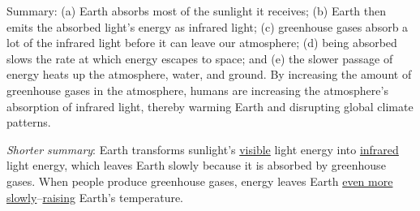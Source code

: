 Summary: (a) Earth absorbs most of the sunlight it receives; (b) Earth then
emits the absorbed light's energy as infrared light; (c) greenhouse gases absorb
a lot of the infrared light before it can leave our atmosphere; (d) being
absorbed slows the rate at which energy escapes to space; and (e) the slower
passage of energy heats up the atmosphere, water, and ground. By increasing the
amount of greenhouse gases in the atmosphere, humans are increasing the
atmosphere's absorption of infrared light, thereby warming Earth and disrupting
global climate patterns.

\emph{Shorter summary}: Earth transforms sunlight's \underline{visible} light
energy into \underline{infrared} light energy, which leaves Earth slowly because
it is absorbed by greenhouse gases. When people produce greenhouse gases, energy
leaves Earth \underline{even more slowly}--\underline{raising} Earth's temperature.
